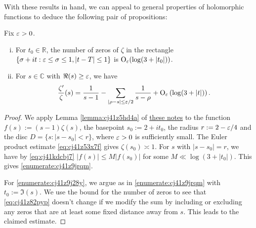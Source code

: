 \documentclass[reqno]{amsart}  \numberwithin{theorem}{section} \numberwithin{equation}{section}
\begin{document}
With these results in hand, we can appeal to general properties of holomorphic functions to deduce the following pair of propositions:
\begin{proposition}\label{proposition:cj41z9de5r}
  Fix $\varepsilon > 0$.
  \begin{enumerate}[(i)]
  \item\label{enumerate:cj41z9jrqm} For $t_0 \in \mathbb{R}$, the number of zeros of $\zeta$ in the rectangle $\{\sigma + i t: \varepsilon \leq \sigma \leq 1, \lvert t - T \rvert \leq 1\}$ is $\operatorname{O}_\varepsilon (\log (3 + \lvert t_0 \rvert))$.
  \item\label{enumerate:cj41z9j28y} For $s \in \mathbb{C}$ with $\Re(s) \geq \varepsilon$, we have
    \begin{equation}\label{eq:cj41z82pyp}
      \frac{\zeta ' }{\zeta }(s)
      =
      \frac{1}{s - 1} - \sum_{
        \lvert \rho - s \rvert \leq \varepsilon/2
      }
      \frac{1}{s - \rho } + \operatorname{O}_{\varepsilon } \left( \log (3 + \lvert t \rvert) \right).
    \end{equation}
  \end{enumerate}
\end{proposition}
\begin{proof}
  We apply Lemma \ref{lemma:cj41z5hd4a} of \href{20230907T143521--complex-analysis-preliminaries.pdf}{these notes} to the function $f(s) := (s - 1) \zeta(s)$, the basepoint $s_0 := 2 + i t_0$, the radius $r := 2 - \varepsilon/4$ and the disc $D = \{s : \lvert s - s_0 \rvert < r\}$, where $\varepsilon > 0$ is sufficiently small.  The Euler product estimate \eqref{eq:cj41z53x7f} gives $\zeta(s_0) \asymp 1$. For $s$ with $\lvert s - s_0\rvert = r$, we have by \eqref{eq:cj41kdcbj7} $\lvert f(s) \rvert \leq M \lvert f(s_0) \rvert$ for some $M \ll \log(3 + \lvert t_0 \rvert)$.  This gives \eqref{enumerate:cj41z9jrqm}.

  For \eqref{enumerate:cj41z9j28y}, we argue as in \eqref{enumerate:cj41z9jrqm} with $t_0 := \Im(s)$.  We use the bound for the number of zeros to see that \eqref{eq:cj41z82pyp} doesn't change if we modify the sum by including or excluding any zeros that are at least some fixed distance away from $s$.  This leads to the claimed estimate.
\end{proof}
\end{document}
